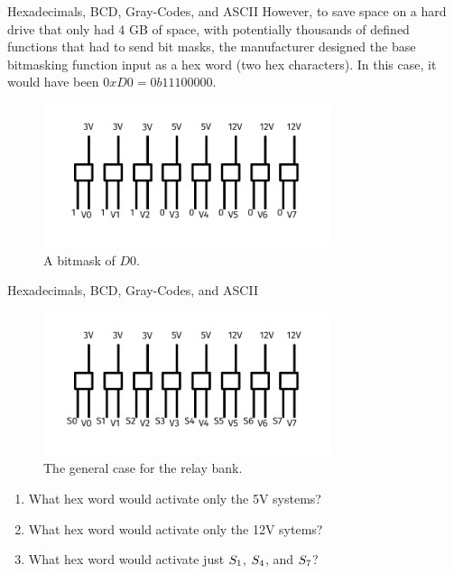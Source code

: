 \documentclass{beamer}
\begin{document}
\begin{frame}{Hexadecimals, BCD, Gray-Codes, and ASCII}
\small However, to save space on a hard drive that only had 4 GB of space, with potentially thousands of defined functions that had to send bit masks, the manufacturer designed the base bitmasking function input as a hex word (two hex characters).  In this case, it would have been $0xD0 = 0b11100000$.
\begin{figure}
\centering
\includegraphics[width=0.75\textwidth,trim=0cm 1cm 0cm 0.5cm,clip=true]{figures/RelayBank2.pdf}
\caption{\label{fig:relay3} \small A bitmask of $D0$.}
\end{figure}
\end{frame}

\begin{frame}{Hexadecimals, BCD, Gray-Codes, and ASCII}
\begin{figure}
\centering
\includegraphics[width=0.75\textwidth,trim=0cm 1cm 0cm 0.5cm,clip=true]{figures/RelayBank.pdf}
\caption{\label{fig:relay4} \small The general case for the relay bank.}
\end{figure}
\small
\begin{enumerate}
\item What hex word would activate only the 5V systems?
\item What hex word would activate only the 12V sytems?
\item What hex word would activate just $S_{\rm 1}$, $S_{\rm 4}$, and $S_{\rm 7}$?
\end{enumerate}
\end{frame}
\end{document}
